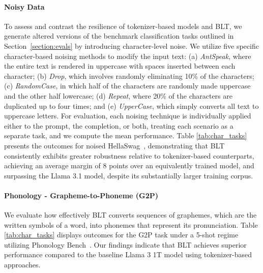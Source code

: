 \paragraph{Noisy Data} To assess and contrast the resilience of tokenizer-based models and {\textsc BLT}, we generate altered versions of the benchmark classification tasks outlined in Section~\ref{section:evals} by introducing character-level noise. We utilize five specific character-based noising methods to modify the input text: (a) \textit{AntSpeak}, where the entire text is rendered in uppercase with spaces inserted between each character; (b) \textit{Drop}, which involves randomly eliminating 10\% of the characters; (c) \textit{RandomCase}, in which half of the characters are randomly made uppercase and the other half lowercase; (d) \textit{Repeat}, where 20\% of the characters are duplicated up to four times; and (e) \textit{UpperCase}, which simply converts all text to uppercase letters. For evaluation, each noising technique is individually applied either to the prompt, the completion, or both, treating each scenario as a separate task, and we compute the mean performance. Table \ref{tab:char_tasks} presents the outcomes for noised HellaSwag~\citep{Eval_hellaswag}, demonstrating that {\textsc BLT} consistently exhibits greater robustness relative to tokenizer-based counterparts, achieving an average margin of 8 points over an equivalently trained model, and surpassing the Llama 3.1 model, despite its substantially larger training corpus.

\paragraph{Phonology - Grapheme-to-Phoneme (G2P)} We evaluate how effectively {\textsc BLT} converts sequences of graphemes, which are the written symbols of a word, into phonemes that represent its pronunciation. Table \ref{tab:char_tasks} displays outcomes for the G2P task under a 5-shot regime utilizing Phonology Bench~\citep{suvarna2024phonologybench}. Our findings indicate that {\textsc BLT} achieves superior performance compared to the baseline Llama 3 1T model using tokenizer-based approaches.


